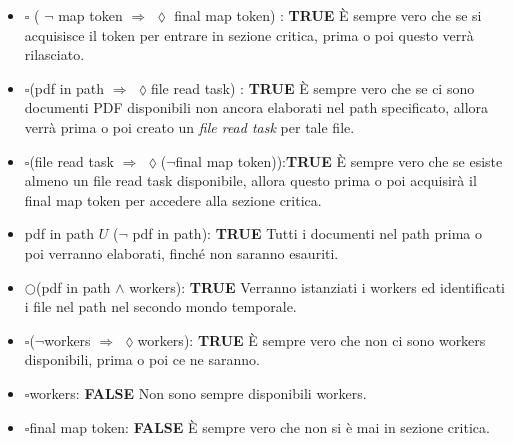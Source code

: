 \begin{itemize}
    \item
    $\square$ ( $\lnot$ map token $\Rightarrow$ $\lozenge$ final map token) : \textbf{TRUE} \newline
    È sempre vero che se si acquisisce il token per entrare in sezione critica, prima o poi questo verrà rilasciato.

\item $\square$(pdf in path $\Rightarrow$ $\lozenge$file read task) : \textbf{TRUE} \newline
    È sempre vero che se ci sono documenti PDF disponibili non ancora elaborati nel path specificato, allora verrà prima o poi creato un \textit {file read task} per tale file.

    \item $\square$(file read task $\Rightarrow$ $\lozenge$($\lnot$final map token)):\textbf{TRUE} \newline
    È sempre vero che se esiste almeno un file read task disponibile, allora questo prima o poi acquisirà il final map token per accedere alla sezione critica.

    \item  pdf in path $U$ ($\lnot$ pdf in path): \textbf{TRUE} \newline
    Tutti i documenti nel path prima o poi verranno elaborati, finché non saranno esauriti.

    \item $\bigcirc$(pdf in path $\wedge$ workers): \textbf{TRUE} \newline
    Verranno istanziati i workers ed identificati i file nel path nel secondo mondo temporale.

    \item $\square$($\lnot$workers $\Rightarrow$ $\lozenge$workers): \textbf{TRUE} \newline
    È sempre vero che non ci sono workers disponibili, prima o poi ce ne saranno.

    \item $\square$workers: \textbf{FALSE} \newline
    Non sono sempre disponibili workers.

    \item $\square$final map token: \textbf{FALSE} \newline
    È sempre vero che non si è mai in sezione critica.

\end{itemize}

